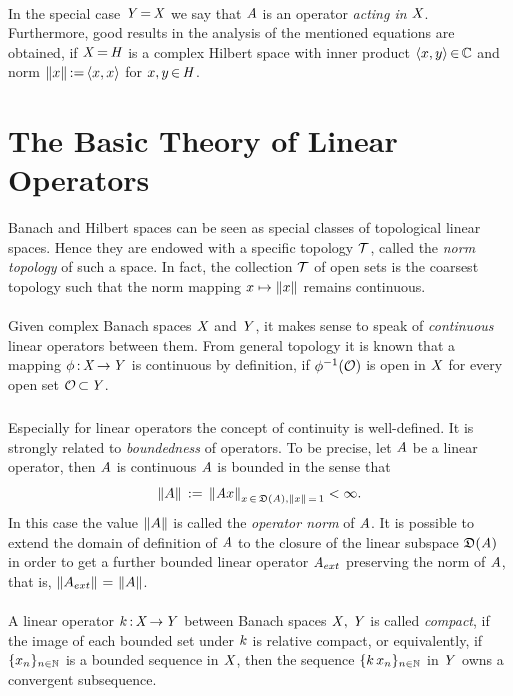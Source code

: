 \documentclass[11pt,twoside]{article}
\begin{document}
\paragraph{}
In the special case $\mathit{Y} {\,=\,} \mathit{X}$ we say that
$\mathit{A}$ is an operator \textit{acting in} $\mathit{X}$.
Furthermore,
good results in the analysis of the mentioned equations are obtained,
if $\mathit{X} {\,=\,} \mathit{H}$ is a complex Hilbert space
with inner product $\langle x,y \rangle {\,\in\,} {\mathbb{C}}$
and norm $\left\lVert x \right\rVert {:=} \, \langle x,x \rangle$ for $x,y {\,\in\,} \mathit{H}$.

\section{The Basic Theory of Linear Operators}
Banach and Hilbert spaces can be seen as special classes of topological linear
spaces.
Hence they are endowed with a specific topology $\mathcal{T}$,
called the \textit{norm topology} of such a space.
In fact, the collection $\mathcal{T}$ of open sets is the coarsest topology
such that the norm mapping $x \mapsto \left\lVert x \right\rVert$ remains continuous.

\paragraph{}
Given complex Banach spaces $\mathit{X}$ and $\mathit{Y}$,
it makes sense to speak of \textit{continuous} linear operators between them.
From general topology it is known that a mapping $\phi{\,:\,}\mathit{X} {\,\to\,} \mathit{Y}$
is continuous by definition,
if $\phi^{-1}(\mathcal{O})$ is open in $\mathit{X}$
for every open set $\mathcal{O} {\,\subset\,} \mathit{Y}$.

\subparagraph{}
Especially for linear operators the concept of continuity is well-defined.
It is strongly related to \textit{boundedness} of operators.
To be precise,
let $\mathit{A}$ be a linear operator, then $\mathit{A}$ is continuous \iff
$\mathit{A}$ is bounded in the sense that
\[
\left\lVert A \right\rVert \,:=\, \left\lVert \mathit{A} x \right\rVert_{x {\,\in\,} \mathfrak{D}(\mathit{A}), \left\lVert x \right\rVert {\,=\,} 1} 
< \infty.
\]
In this case the value $\left\lVert A \right\rVert$ is called the \textit{operator norm}
of $\mathit{A}$.
It is possible to extend the domain of definition of $\mathit{A}$ to the closure
of the linear subspace $\mathfrak{D}(\mathit{A})$ in order to get a further bounded
linear operator $\mathit{A}_{ext}$ preserving the norm of $\mathit{A}$,
that is,
$\left\lVert A_{ext} \right\rVert {\,=\,} \left\lVert A \right\rVert$.

\paragraph{}
A linear operator $k {\,:\,} \mathit{X} {\,\to\,} \mathit{Y}$ between Banach spaces
$\mathit{X},\,\mathit{Y}$ is called \textit{compact},
if the image of each bounded set under $k$ is relative compact,
or equivalently,
if $\{x_n\}_{n \in {\mathbb{N}}}$ is a bounded sequence in $\mathit{X}$,
then the sequence $\{k \, x_n\}_{n \in {\mathbb{N}}}$ in $\mathit{Y}$
owns a convergent subsequence.
\end{document}
